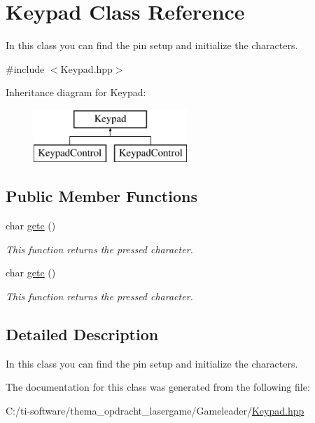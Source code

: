 \hypertarget{class_keypad}{}\section{Keypad Class Reference}
\label{class_keypad}


In this class you can find the pin setup and initialize the characters.  




{\ttfamily \#include $<$Keypad.\+hpp$>$}

Inheritance diagram for Keypad\+:\begin{figure}[H]
\begin{center}
\leavevmode
\includegraphics[height=2.000000cm]{class_keypad}
\end{center}
\end{figure}
\subsection*{Public Member Functions}
\begin{DoxyCompactItemize}
\item 
\mbox{\label{class_keypad_ade2df731c6751f21bbf745b276cb7208}} 
char \mbox{\hyperlink{class_keypad_ade2df731c6751f21bbf745b276cb7208}{getc}} ()
\begin{DoxyCompactList}\small\item\em This function returns the pressed character. \end{DoxyCompactList}\item 
\mbox{\label{class_keypad_ade2df731c6751f21bbf745b276cb7208}} 
char \mbox{\hyperlink{class_keypad_ade2df731c6751f21bbf745b276cb7208}{getc}} ()
\begin{DoxyCompactList}\small\item\em This function returns the pressed character. \end{DoxyCompactList}\end{DoxyCompactItemize}


\subsection{Detailed Description}
In this class you can find the pin setup and initialize the characters. 

The documentation for this class was generated from the following file\+:\begin{DoxyCompactItemize}
\item 
C\+:/ti-\/software/thema\+\_\+opdracht\+\_\+lasergame/\+Gameleader/\mbox{\hyperlink{_gameleader_2_keypad_8hpp}{Keypad.\+hpp}}\end{DoxyCompactItemize}
